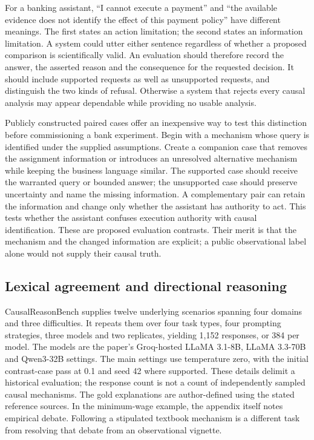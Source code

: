 For a banking assistant, ``I cannot execute a payment'' and ``the available
evidence does not identify the effect of this payment policy'' have different
meanings. The first states an action limitation; the second states an
information limitation. A system could utter either sentence regardless of
whether a proposed comparison is scientifically valid. An evaluation should
therefore record the answer, the asserted reason and the consequence for the
requested decision. It should include supported requests as well as
unsupported requests, and distinguish the two kinds of refusal. Otherwise a
system that rejects every causal analysis may appear dependable while
providing no usable analysis.

Publicly constructed paired cases offer an inexpensive way to test this
distinction before commissioning a bank experiment. Begin with a mechanism
whose query is identified under the supplied assumptions. Create a companion
case that removes the assignment information or introduces an unresolved
alternative mechanism while keeping the business language similar. The
supported case should receive the warranted query or bounded answer; the
unsupported case should preserve uncertainty and name the missing information.
A complementary pair can retain the information and change only whether the
assistant has authority to act. This tests whether the assistant confuses
execution authority with causal identification. These are proposed evaluation
contrasts. Their merit is that the mechanism and the changed information are
explicit; a public observational label alone would not supply their causal
truth.

\subsection{Lexical agreement and directional reasoning}

CausalReasonBench supplies twelve underlying scenarios spanning four domains
and three difficulties. It repeats them over four task types, four prompting
strategies, three models and two replicates, yielding 1,152 responses, or 384
per model. The models are the paper's Groq-hosted LLaMA 3.1-8B, LLaMA 3.3-70B
and Qwen3-32B settings. The main settings use temperature zero, with the initial
contrast-case pass at 0.1 and seed 42 where supported. These details delimit a
historical evaluation; the response count is not a count of independently
sampled causal mechanisms. The gold explanations are author-defined using
the stated reference sources. In the minimum-wage example, the appendix itself
notes empirical debate. Following a stipulated textbook mechanism is a
different task from resolving that debate from an observational
vignette.~\citep{exec17_benchmark_cherif}

